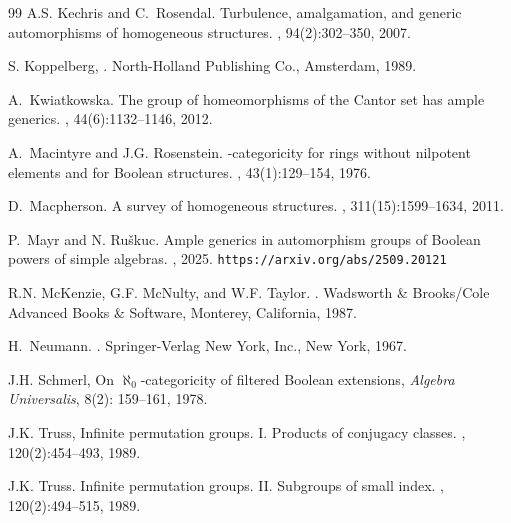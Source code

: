 \documentclass[12pt,a4paper,reqno]{amsart}
\numberwithin{equation}{section}
\theoremstyle{plain}
\theoremstyle{definition}
\begin{document}
\begin{thebibliography}{99}
A.S. Kechris and C.~Rosendal.
\newblock Turbulence, amalgamation, and generic automorphisms of homogeneous
  structures.
, 94(2):302--350, 2007.

S. Koppelberg,
.
\newblock North-Holland Publishing Co., Amsterdam, 1989.

A.~Kwiatkowska.
\newblock The group of homeomorphisms of the {C}antor set has ample generics.
, 44(6):1132--1146, 2012.

A.~Macintyre and J.G. Rosenstein.
-categoricity for rings without nilpotent elements and for {B}oolean structures.
, 43(1):129--154, 1976.

D.~Macpherson.
\newblock A survey of homogeneous structures.
, 311(15):1599--1634, 2011.

  P.~Mayr and N. Ru{\v s}kuc.
\newblock Ample generics in automorphism groups of Boolean powers of simple algebras.
, 2025. \verb+https://arxiv.org/abs/2509.20121+



R.N. McKenzie, G.F. McNulty, and W.F. Taylor.
.
\newblock Wadsworth \& Brooks/Cole Advanced Books \& Software, Monterey,
  California, 1987.
  
H.~Neumann.
.
\newblock Springer-Verlag New York, Inc., New York, 1967.

J.H. Schmerl,
On $\aleph_0$-categoricity of filtered Boolean extensions,
{\it Algebra Universalis},    8(2): 159--161, 1978.


J.K. Truss,
Infinite permutation groups. I. Products of conjugacy classes.
, 120(2):454--493, 1989.

J.K. Truss.
\newblock Infinite permutation groups. {II}. {S}ubgroups of small index.
, 120(2):494--515, 1989.

\end{thebibliography}
\end{document}
